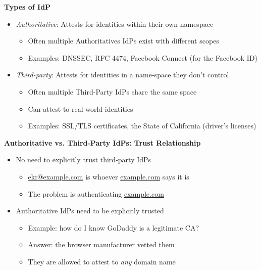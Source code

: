 \documentclass[helvetica]{seminar}
\newcommand{\heading}[1]{%
  \begin{center} 
    \large\bf 
    #1 
  \end{center} 
  \vspace{.4 in}}
\begin{document}
\begin{slide}
\heading{Types of IdP}

\begin{itemize}
\item[] \emph{Authoritative}: Attests for identities within their own namespace
  \begin{itemize}
  \item Often multiple Authoritatives IdPs exist with different scopes
  \item Examples: DNSSEC, RFC 4474, Facebook Connect (for the Facebook ID)
  \end{itemize}

\item[] \emph{Third-party}: Attests for identities in a name-space they don't control
  \begin{itemize}
  \item Often multiple Third-Party IdPs share the same space
  \item Can attest to real-world identities
  \item Examples: SSL/TLS certificates, the State of California (driver's licenses)
  \end{itemize}
\end{itemize}
\end{slide}


\begin{slide}
\heading{Authoritative vs. Third-Party IdPs: Trust Relationship}

\begin{itemize}
\item No need to explicitly trust third-party IdPs
  \begin{itemize}
  \item \url{ekr@example.com} is whoever \url{example.com} says it is
  \item The problem is authenticating \url{example.com}
  \end{itemize}

\item Authoritative IdPs need to be explicitly trusted
  \begin{itemize}
  \item Example: how do I know GoDaddy is a legitimate CA?
  \item Answer: the browser manufacturer vetted them
  \item They are allowed to attest to \emph{any} domain name
  \end{itemize}
\end{itemize}
\end{slide}
\end{document}
